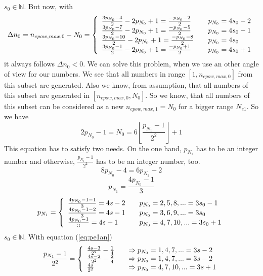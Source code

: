 \documentclass{aomart}
\theoremstyle{definition}
\begin{document}
$s_{0} \in \mathbb{N}$. But now, with
\[ \Delta n_{0} = n_{epow,max,0} - N_{0} = \left\{
	\begin{array}{l@{\quad \quad}l}
	\frac{3p_{N_{0}}-4}{2} - 2p_{N_{0}} + 1 = \frac{-p_{N_{0}}-2}{2} & p_{N_{0}}=4s_{0}-2 \\
	\frac{3p_{N_{0}}-7}{2} - 2p_{N_{0}} + 1 = \frac{-p_{N_{0}}-5}{2} & p_{N_{0}}=4s_{0}-1 \\
	\frac{3p_{N_{0}}-10}{2} - 2p_{N_{0}} + 1 = \frac{-p_{N_{0}}-8}{2} & p_{N_{0}}=4s_{0} \\
	\frac{3p_{N_{0}}-1}{2} - 2p_{N_{0}} + 1 = \frac{-p_{N_{0}}+1}{2} & p_{N_{0}}=4s_{0}+1 \\
\end{array}
\right. \] 
it always follows $\Delta n_{0} < 0$. We can solve this problem, when we use an other angle of view for our numbers. We see that all numbers in range $[1,n_{epow,max,0}]$ from this subset are generated. Also we know, from assumption, that all numbers of this subset are generated in $[n_{epow,max,0},N_{0}]$. So we know, that all numbers of this subset can be considered as a new $n_{epow,max,1} = N_{0}$ for a bigger range $N_{e1}$. So we have
\begin{equation}\label{eq:pe1an}
	2p_{N_{0}} - 1 = N_{0} = 6 \left\lfloor \frac{p_{N_{1}} - 1}{2^{2}} \right\rfloor + 1
\end{equation}
This equation has to satisfy two needs. On the one hand, $p_{N_{1}}$ has to be an integer number and otherwise, $\frac{p_{N_{1}}-1}{2^{2}}$ has to be an integer number, too.
\[ 8p_{N_{0}} - 4 = 6p_{N_{1}} - 2 \]
\begin{equation}\label{eq:pe1}
	p_{N_{1}} = \frac{4p_{N_{0}} - 1}{3}
\end{equation}
\begin{equation} p_{N_{1}} = \left\{
	\begin{array}{l@{\quad \quad}l}
	\frac{4p_{N_{0}}-1-1}{3} = 4s-2 & p_{N_{0}}=2,5,8,... = 3s_{0} - 1 \\
	\frac{4p_{N_{0}}-1-2}{3} = 4s-1 & p_{N_{0}}=3,6,9,... = 3s_{0} \\
	\frac{4p_{N_{0}}-1}{3} = 4s+1& p_{N_{0}}=4,7,10,... = 3s_{0} + 1  
\end{array}
\right. \label{eq:pn1cases} \end{equation} 
$s_{0} \in \mathbb{N}$. With equation (\ref{eq:pe1an})
\[ \frac{p_{N_{1}}-1}{2^{2}} = \left\{
	\begin{array}{l@{\quad \quad}l}
	\frac{4s-3}{2^{2}} - \frac{1}{4} & \Rightarrow p_{N_{0}} = 1,4,7,... = 3s-2 \\
	\frac{4s-2}{2^{2}} - \frac{2}{4} & \Rightarrow p_{N_{0}} = 1,4,7,... = 3s-2 \\
	\frac{4s}{2^{2}} & \Rightarrow p_{N_{0}} = 4,7,10,... = 3s+1   
\end{array}
\right. \] 
\end{document}
